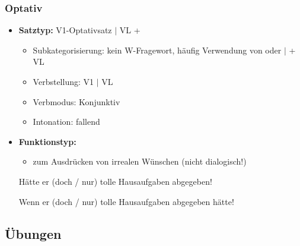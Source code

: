 \begin{frame}
\frametitle{Optativ}

\begin{itemize}
	\item \textbf{Satztyp:} V1-Optativsatz $|$ VL + 
	\begin{itemize}
		\item Subkategorisierung: kein W-Fragewort, häufig Verwendung von  oder  $|$  + VL
		\item Verbstellung: V1 $|$ VL
		\item Verbmodus: Konjunktiv
		\item Intonation: fallend
	\end{itemize}
	\item \textbf{Funktionstyp:}
	\begin{itemize}
		\item zum Ausdrücken von irrealen Wünschen (nicht dialogisch!)
	\end{itemize}
	
	\ea Hätte er (doch / nur) tolle Hausaufgaben abgegeben!
	\z
	
	\ea Wenn er (doch / nur) tolle Hausaufgaben abgegeben hätte!
	\z
		
\end{itemize}

\end{frame}


\subsection{Übungen}


